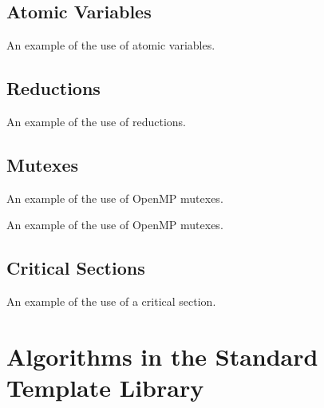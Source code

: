 \subsection{Atomic Variables}

\raggedbottom
\begin{codebox}[]{\href{https://godbolt.org/z/}{\ExternalLink}}
\footnotesize An example of the use of atomic variables.
\tcblower
{}
\end{codebox}

\subsection{Reductions}

\raggedbottom
\begin{codebox}[]{\href{https://godbolt.org/z/}{\ExternalLink}}
\footnotesize An example of the use of reductions.
\tcblower
{}
\end{codebox}

\subsection{Mutexes}

\raggedbottom
\begin{codebox}[]{\href{https://godbolt.org/z/}{\ExternalLink}}
\footnotesize An example of the use of OpenMP mutexes.
\tcblower
{}
\end{codebox}

\raggedbottom
\begin{codebox}[]{\href{https://godbolt.org/z/}{\ExternalLink}}
\footnotesize An example of the use of OpenMP mutexes.
\tcblower
{}
\end{codebox}

\subsection{Critical Sections}

\raggedbottom
\begin{codebox}[]{\href{https://godbolt.org/z/}{\ExternalLink}}
\footnotesize An example of the use of a critical section.
\tcblower
{}
\end{codebox}


\section{Algorithms in the Standard Template Library}

